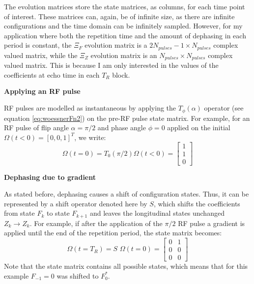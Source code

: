 \hfill

The evolution matrices store the state matrices, as columns, for each time point of interest.
These matrices can, again, be of infinite size, as there are infinite configurations and the time domain can be infinitely sampled.
However, for my application where both the repetition time and the amount of dephasing in each period is constant, the $\Xi_F$ evolution matrix is a $2N_{pulses}-1 \times N_{pulses}$ complex valued matrix, while the $\Xi_Z$ evolution matrix is an $N_{pulses} \times N_{pulses}$ complex valued matrix.
This is because I am only interested in the values of the coefficients at echo time in each $T_R$ block.

\hfill

\textbf{Applying an RF pulse}

RF pulses are modelled as instantaneous by applying the $T_{\phi}(\alpha)$ operator (see equation \ref{eq:woessnerFn2}) on the pre-RF pulse state matrix.
For example, for an RF pulse of flip angle $\alpha = \pi/2$ and phase angle $\phi = 0$ applied on the initial $\Omega (t < 0) = [0, 0, 1]^T$, we write:
\begin{equation}
    \Omega (t = 0) = T_0(\pi/2) \Omega (t < 0) = 
    \begin{bmatrix} 
        1 \\
        1 \\
        0
    \end{bmatrix}
\end{equation}

\hfill

\textbf{Dephasing due to gradient}

As stated before, dephasing causes a shift of configuration states.
Thus, it can be represented by a shift operator denoted here by $S$, 
which shifts the coefficients from state $F_k$ to state $F_{k+1}$ and leaves the longitudinal states unchanged $Z_k \rightarrow Z_k$. 
For example, if after the application of the $\pi/2$ RF pulse a gradient is applied until the end of the repetition period, the state matrix becomes:
\begin{equation}
    \Omega (t = T_R) = S \, \, \Omega (t = 0) = 
    \begin{bmatrix} 
        0 & 1\\
        0 & 0\\
        0 & 0
    \end{bmatrix}
\end{equation}
Note that the state matrix contains all possible states, which means that for this example $F_{-1} = 0$ was shifted to $F_0^*$.

